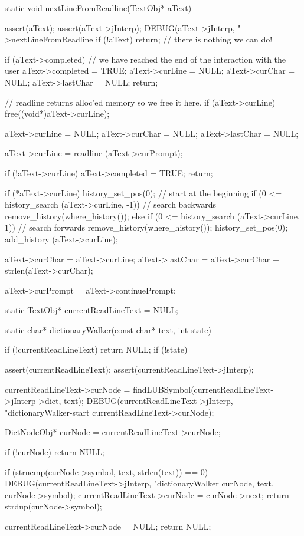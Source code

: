\startCCode
static void nextLineFromReadline(TextObj* aText) {
  assert(aText);
  assert(aText->jInterp);
  DEBUG(aText->jInterp, "->nextLineFromReadline %
  if (!aText) return; // there is nothing we can do!

  if (aText->completed) {
    // we have reached the end of the interaction with the user
    aText->completed = TRUE;
    aText->curLine   = NULL;
    aText->curChar   = NULL;
    aText->lastChar  = NULL;
    return;
  }

  // readline returns alloc'ed memory so we free it here.
  if (aText->curLine) free((void*)aText->curLine);

  aText->curLine  = NULL;
  aText->curChar  = NULL;
  aText->lastChar = NULL;

  aText->curLine = readline (aText->curPrompt);

  if (!aText->curLine) {
    aText->completed = TRUE;
    return;
  }

  if (*aText->curLine) {
    history_set_pos(0); // start at the beginning
    if (0 <= history_search (aText->curLine, -1)) { // search backwards
      remove_history(where_history());
    } else if (0 <= history_search (aText->curLine, 1)) { // search forwards
      remove_history(where_history());
    }
    history_set_pos(0);
    add_history (aText->curLine);
  }

  aText->curChar  = aText->curLine;
  aText->lastChar = aText->curChar + strlen(aText->curChar);

  aText->curPrompt = aText->continuePrompt;
}
\stopCCode

\startCCode
static TextObj* currentReadLineText = NULL;
\stopCCode

\startCCode
static char* dictionaryWalker(const char* text, int state) {
  if (!currentReadLineText) return NULL;
  if (!state) {

    assert(currentReadLineText);
    assert(currentReadLineText->jInterp);

    currentReadLineText->curNode =
      findLUBSymbol(currentReadLineText->jInterp->dict, text);
    DEBUG(currentReadLineText->jInterp,
          "dictionaryWalker-start %
          currentReadLineText->curNode);
  }
  DictNodeObj* curNode = currentReadLineText->curNode;

  if (!curNode) return NULL;

  if (strncmp(curNode->symbol, text, strlen(text)) == 0) {
    DEBUG(currentReadLineText->jInterp,
          "dictionaryWalker %
          curNode, text, curNode->symbol);
    currentReadLineText->curNode = curNode->next;
    return strdup(curNode->symbol);
  }

  currentReadLineText->curNode = NULL;
  return NULL;
}

